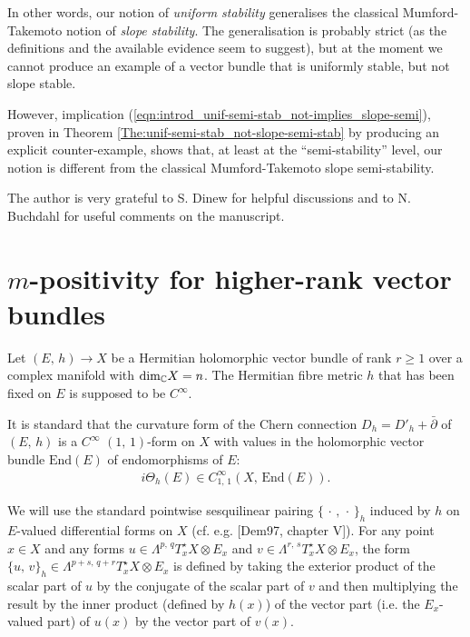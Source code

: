\documentclass[12pt]{article}
\begin{document}
In other words, our notion of {\it uniform stability} generalises the classical Mumford-Takemoto notion of {\it slope stability}. The generalisation is probably strict (as the definitions and the available evidence seem to suggest), but at the moment we cannot produce an example of a vector bundle that is uniformly stable, but not slope stable.

However, implication (\ref{eqn:introd_unif-semi-stab_not-implies_slope-semi}), proven in Theorem \ref{The:unif-semi-stab_not-slope-semi-stab} by producing an explicit counter-example, shows that, at least at the ``semi-stability'' level, our notion is different from the classical Mumford-Takemoto slope semi-stability. 

\vspace{2ex}

 The author is very grateful to S. Dinew for helpful discussions and to N. Buchdahl for useful comments on the manuscript. 



\section{$m$-positivity for higher-rank vector bundles}\label{section:m-pos_v-bundles} Let $(E,\,h)\longrightarrow X$ be a Hermitian holomorphic vector bundle of rank $r\geq 1$ over a complex manifold with $\mbox{dim}_{\mathbb{C}} X =n$. The Hermitian fibre metric $h$ that has been fixed on $E$ is supposed to be $C^\infty$.

It is standard that the curvature form of the Chern connection $D_h=D'_h + \bar\partial$ of $(E,\,h)$ is a $C^\infty$ $(1,\,1)$-form on $X$ with values in the holomorphic vector bundle $\mbox{End}(E)$ of endomorphisms of $E$: \begin{eqnarray*}i\Theta_h(E)\in C^\infty_{1,\,1}(X,\,\mbox{End}(E)).\end{eqnarray*}

We will use the standard pointwise sesquilinear pairing $\{\,\cdot\,,\,\cdot\,\}_h$ induced by $h$ on $E$-valued differential forms on $X$ (cf. e.g. [Dem97, chapter V]). For any point $x\in X$ and any forms $u\in\Lambda^{p,\,q}T^\star_x X\otimes E_x$ and $v\in\Lambda^{r,\,s}T^\star_x X\otimes E_x$, the form $\{u,\,v\}_h \in\Lambda^{p+s,\,q+r}T^\star_x X\otimes E_x$ is defined by taking the exterior product of the scalar part of $u$ by the conjugate of the scalar part of $v$ and then multiplying the result by the inner product (defined by $h(x)$) of the vector part (i.e. the $E_x$-valued part) of $u(x)$ by the vector part of $v(x)$.
\end{document}
